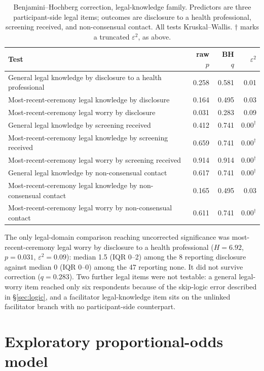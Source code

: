 \documentclass[12pt]{article}
\begin{document}
\begin{table}[htbp]
\centering
\caption{Benjamini--Hochberg correction, legal-knowledge family. Predictors are three participant-side
legal items; outcomes are disclosure to a health professional, screening received, and non-consensual
contact. All tests Kruskal--Wallis. $\dagger$ marks a truncated $\varepsilon^2$, as above.}
\begin{tabular}{lrrr}
\toprule
Test & raw $p$ & BH $q$ & $\varepsilon^2$ \\
\midrule
General legal knowledge by disclosure to a health professional & 0.258 & 0.581 & 0.01 \\
Most-recent-ceremony legal knowledge by disclosure & 0.164 & 0.495 & 0.03 \\
Most-recent-ceremony legal worry by disclosure & 0.031 & 0.283 & 0.09 \\
General legal knowledge by screening received & 0.412 & 0.741 & $0.00^{\dagger}$ \\
Most-recent-ceremony legal knowledge by screening received & 0.659 & 0.741 & $0.00^{\dagger}$ \\
Most-recent-ceremony legal worry by screening received & 0.914 & 0.914 & $0.00^{\dagger}$ \\
General legal knowledge by non-consensual contact & 0.617 & 0.741 & $0.00^{\dagger}$ \\
Most-recent-ceremony legal knowledge by non-consensual contact & 0.165 & 0.495 & 0.03 \\
Most-recent-ceremony legal worry by non-consensual contact & 0.611 & 0.741 & $0.00^{\dagger}$ \\
\bottomrule
\end{tabular}
\end{table}

\noindent
The only legal-domain comparison reaching uncorrected significance was most-recent-ceremony legal worry by
disclosure to a health professional ($H=6.92$, $p=0.031$, $\varepsilon^2=0.09$): median 1.5 (IQR 0--2) among
the 8 reporting disclosure against median 0 (IQR 0--0) among the 47 reporting none. It did not survive
correction ($q=0.283$). Two further legal items were not testable: a general legal-worry item reached only
six respondents because of the skip-logic error described in \S\ref{sec:logic}, and a facilitator
legal-knowledge item sits on the unlinked facilitator branch with no participant-side counterpart.

\section{Exploratory proportional-odds model}
\end{document}
